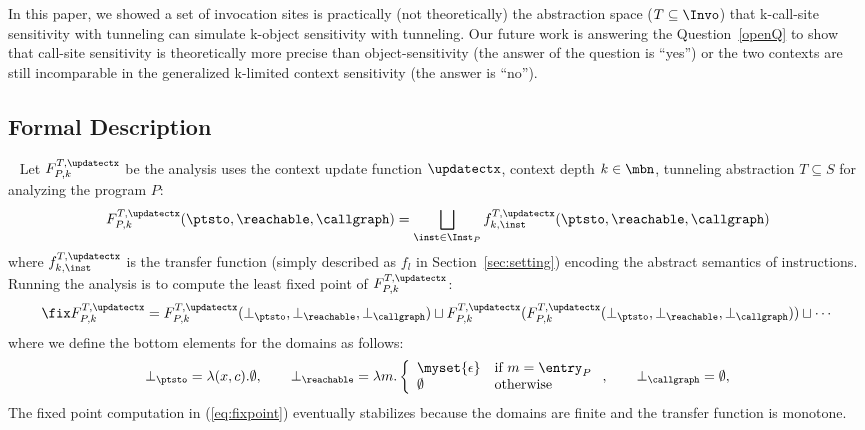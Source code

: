 In this paper, we showed a set of invocation sites is practically (not
theoretically) the abstraction space ($T \subseteq \Invo$) that
k-call-site sensitivity with tunneling can simulate k-object
sensitivity with tunneling. Our future work 
is answering the {\sc Question~\ref{openQ}} to show that
call-site sensitivity is theoretically more precise than
object-sensitivity (the answer of the question is ``yes'') or the two
contexts are still incomparable in the generalized k-limited context
sensitivity (the answer is ``no''). 





\subsection{Formal Description}~\label{sec:quextion:formal}
Let $F_{P,k}^{T, \updatectx}$ be the analysis uses the context update
function $\updatectx$, context depth $k\in\mbn$, tunneling abstraction
$T \subseteq S$ for analyzing the program $P$:
\begin{equation}\label{eq:analysis}
F_{P,k}^{T, \updatectx}(\ptsto, \reachable, \callgraph) = \bigsqcup_{\inst \in \Inst_P}
f_{k, \inst}^{T, \updatectx}(\ptsto,
\reachable, \callgraph)
\end{equation}
where $f_{k, \inst}^{T, \updatectx}$ is the transfer function (simply described
as $f_l$ in Section~\ref{sec:setting}) encoding
the abstract semantics of instructions. Running the analysis is to compute the least fixed point of
$F^{T, \updatectx}_{P,k}$:
\begin{equation}\label{eq:fixpoint}
  \fix F_{P,k}^{T, \updatectx} = F^{T, \updatectx}_{P,k}
  (\bot_\ptsto, \bot_\reachable,\bot_\callgraph) \sqcup F^{T, \updatectx}_{P,k}  (F^{T, \updatectx}_{P,k}
  (\bot_\ptsto, \bot_\reachable,\bot_\callgraph)) \sqcup \cdots
\end{equation}
where we define the bottom elements for the domains as follows:
\[
  \bot_\ptsto = \lambda (x,c).\emptyset, \qquad \bot_\reachable =
\lambda m. \left\{ \begin{array}{ll} \myset{\epsilon} & \mbox{if}~m =
                                                        \entry_P \\
                     \emptyset & \mbox{otherwise} \end{array} \right., \qquad
  \bot_\callgraph = \emptyset,
\]
The fixed point computation in (\ref{eq:fixpoint})
eventually stabilizes because the domains are
finite and the transfer function is monotone.





